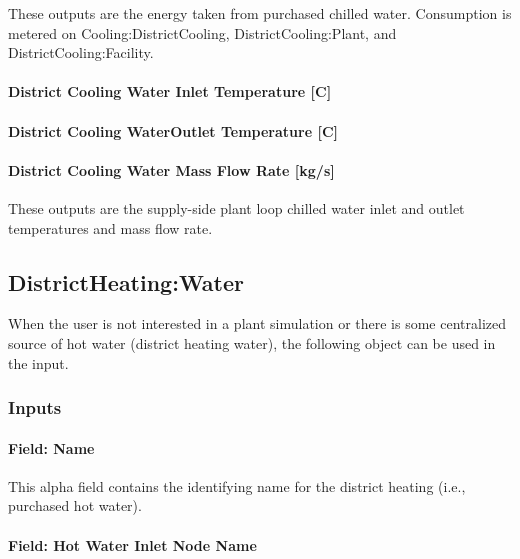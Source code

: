These outputs are the energy taken from purchased chilled water. Consumption is metered on Cooling:DistrictCooling, DistrictCooling:Plant, and DistrictCooling:Facility.

\paragraph{District Cooling Water Inlet Temperature {[}C{]}}\label{district-cooling-inlet-temperature-c}

\paragraph{District Cooling WaterOutlet Temperature {[}C{]}}\label{district-cooling-outlet-temperature-c}

\paragraph{District Cooling Water Mass Flow Rate {[}kg/s{]}}\label{district-cooling-mass-flow-rate-kgs}

These outputs are the supply-side plant loop chilled water inlet and outlet temperatures and mass flow rate.

\subsection{DistrictHeating:Water}\label{districtheating}

When the user is not interested in a plant simulation or there is some centralized source of hot water (district heating water), the following object can be used in the input.

\subsubsection{Inputs}\label{inputs-17-006}

\paragraph{Field: Name}\label{field-name-16-006}

This alpha field contains the identifying name for the district heating (i.e., purchased hot water).

\paragraph{Field: Hot Water Inlet Node Name}\label{field-hot-water-inlet-node-name-2}

